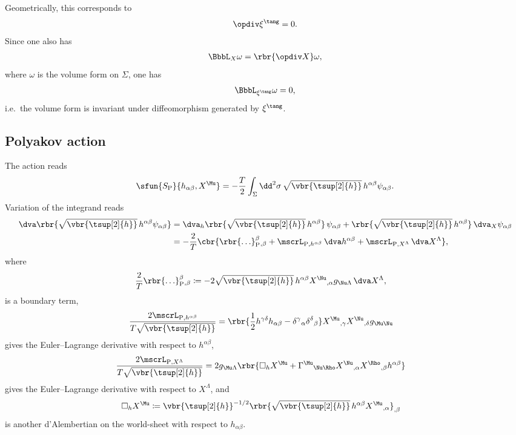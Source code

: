 \documentclass[a4paper,11pt]{article}
\begin{document}
Geometrically, this corresponds to
\begin{align}
	\opdiv \xi^{\tang} = 0.
\end{align}
Since one also has
\begin{align}
	\BbbL_X \omega = \rbr{\opdiv X} \omega,
\end{align}
where $\omega$ is the volume form on $\Sigma$, one has 
\begin{align}
	\BbbL_{\xi^{\tang}} \omega = 0,
\end{align}
i.e.\ the volume form is invariant under diffeomorphism generated by 
$\xi^{\tang}$.

\subsection{Polyakov action}
\label{sec:bos-str-pol}

The action reads \cite{Deser_1976,Brink_1976,Polyakov1981}
\begin{align}
\sfun{S_\text{P}}{h_{\alpha\beta}, X^{\Mu}} = -\frac{T}{2} \int_{\Sigma}
\dd^2 \sigma\, \sqrt{\vbr{\tsup[2]{h}}}\, h^{\alpha\beta} \psi_{\alpha\beta}.
\end{align}
Variation of the integrand reads
\begin{align}
\dva \rbr{\sqrt{\vbr{\tsup[2]{h}}}\, h^{\alpha\beta} \psi_{\alpha\beta}}
&= \dva_h \rbr{\sqrt{\vbr{\tsup[2]{h}}}\, h^{\alpha\beta}}\, \psi_{\alpha\beta}
+ \rbr{\sqrt{\vbr{\tsup[2]{h}}}\, h^{\alpha\beta}}\, \dva_X  \psi_{\alpha\beta}
\nonumber \\
&= - \frac{2}{T} \cbr{ \rbr{\ldots}_{\text{P}}^{\beta}{}_{,\beta} + 
\mscrL_{\text{P}, h^{\alpha\beta}}\, \dva h^{\alpha\beta} +
\mscrL_{\text{P}, X^{\Lambda}}\, \dva X^{\Lambda} },
\end{align}
where
\begin{align}
\frac{2}{T} \rbr{\ldots}_{\text{P}}^{\beta}{}_{,\beta} &\coloneqq
- 2\sqrt{\vbr{\tsup[2]{h}}}\, 
h^{\alpha\beta} X^{\Nu}{}_{,\alpha} g_{\Nu\Lambda}\,\dva X^{\Lambda},
\end{align}
is a boundary term,
\begin{align}
\frac{2\mscrL_{\text{P}, h^{\alpha\beta}}}{T \sqrt{\vbr{\tsup[2]{h}}}} &= 
\rbr{\frac{1}{2} h^{\gamma\delta} h_{\alpha\beta} -
	\delta^{\gamma}{}_{\alpha} \delta^{\delta}{}_{\beta}}
X^{\Mu}{}_{,\gamma} X^{\Nu}{}_{,\delta} g_{\Mu\Nu}
\end{align}
gives the Euler--Lagrange derivative with respect to $h^{\alpha\beta}$,
\begin{align}
\frac{2 \mscrL_{\text{P}, X^{\Lambda}}}{T\sqrt{\vbr{\tsup[2]{h}}}}  &= 2
g_{\Mu\Lambda}\rbr{\square_h X^{\Mu} +
\Gamma^{\Mu}{}_{\Nu\Rho} X^{\Nu}{}_{,\alpha} X^{\Rho}{}_{,\beta} 
h^{\alpha\beta}}
\end{align}
gives the Euler--Lagrange derivative with respect to $X^{\Lambda}$, and
\begin{align}
\square_h X^{\Mu} &\coloneqq
\vbr{\tsup[2]{h}}^{-1/2} \rbr{\sqrt{\vbr{\tsup[2]{h}}}\, 
	h^{\alpha\beta} X^{\Mu}{}_{,\alpha}}_{,\beta}
\end{align}
is another d'Alembertian on the world-sheet with respect to $h_{\alpha\beta}$.
\end{document}
